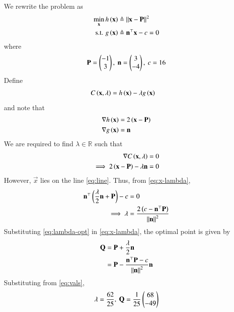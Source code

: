 \documentclass[journal,12pt,twocolumn]{IEEEtran}
\begin{document}
\begin{enumerate}
    \solution We rewrite the problem as
    \begin{align}
        \min_{\mathbf{x}} h\left(\mathbf{x}\right) &\triangleq \left\lVert\mathbf{x}-\mathbf{P}\right\rVert^2 \\
        \textrm{s.t. } g\left(\mathbf{x}\right) &\triangleq \mathbf{n}^\top\mathbf{x} - c = 0
        \label{eq:lag-opt}
    \end{align}
    where
    \begin{align}
        \mathbf{P} = \begin{pmatrix}-1\\3\end{pmatrix},\ \mathbf{n} = \begin{pmatrix}3\\-4\end{pmatrix},\ c = 16
        \label{eq:vals}
    \end{align}
    Define
    \begin{align}
        C\left(\mathbf{x},\lambda\right) &= h\left(\mathbf{x}\right) - \lambda g\left(\mathbf{x}\right)
        \label{eq:C-def}
    \end{align}
    and note that
    \begin{align}
        \nabla h\left(\mathbf{x}\right) &= 2\left(\mathbf{x}-\mathbf{P}\right) \\
        \nabla g\left(\mathbf{x}\right) &= \mathbf{n}
        \label{eq:diff-gh}
    \end{align}
    We are required to find $\lambda \in \mathbb{R}$ such that
    \begin{align}
        \nabla C\left(\mathbf{x},\lambda\right) &= 0 \\
        \implies 2\left(\mathbf{x}-\mathbf{P}\right) - \lambda\mathbf{n} &= 0
        \label{eq:x-lambda}
    \end{align}
    However, $\vec{x}$ lies on the line \eqref{eq:line}. Thus, from
    \eqref{eq:x-lambda},
    \begin{align}
        \mathbf{n}^\top\left(\frac{\lambda}{2}\mathbf{n}+\mathbf{P}\right) - c &= 0 \\
        \implies \lambda &= \frac{2\left(c-\mathbf{n}^\top\mathbf{P}\right)}{\left\lVert\mathbf{n}\right\rVert^2}
        \label{eq:lambda-opt}
    \end{align}
    Substituting \eqref{eq:lambda-opt} in \eqref{eq:x-lambda}, the optimal
    point is given by
    \begin{align}
        \mathbf{Q} &= \mathbf{P} + \frac{\lambda}{2}\mathbf{n} \\
                &= \mathbf{P} - \frac{\mathbf{n}^\top\mathbf{P}-c}{\left\lVert\mathbf{n}\right\rVert^2}\mathbf{n}
                \label{eq:x-sol-lag}
    \end{align}
    Substituting from \eqref{eq:vals},
    \begin{align}
        \lambda = \frac{62}{25},\ \vec{Q} = \frac{1}{25}\myvec{68\\-49}

\end{align}
\end{enumerate}
\end{document}
